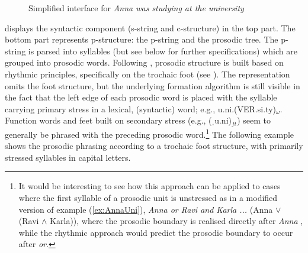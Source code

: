 \documentclass[output=paper,hidelinks]{langscibook}
\begin{document}
\begin{figure}
\caption{Simplified interface for {\em Anna was studying at the university} \citep[][408, showing only c-structure terminal nodes]{DLM:LFG}}%
\label{fig:simple}

\end{figure}

 displays the syntactic component (s-string and c-structure) in the top part. The bottom part represents p-structure: the p-string and the prosodic tree. The p-string is parsed into syllables (but see below for further specifications) which are grouped into prosodic words. Following \citet{LahiriPlank2010}, prosodic structure is built based on rhythmic principles, specifically on the trochaic foot (see ). The representation omits the foot structure, but the 
underlying formation algorithm is still visible in the fact that the left edge of each prosodic word is placed with the syllable carrying primary stress in a lexical, (syntactic) word; e.g., u.ni.(VER.si.ty)$_{\omega}$. Function words and feet built on secondary stress (e.g., (ˌu.ni)$_{ft}$) seem to generally be phrased with the preceding prosodic word.\footnote{It would be interesting to see how this approach can be applied to cases where the first syllable of a prosodic unit is unstressed as in a modified version of example (\ref{ex:AnnaUni}), {\em Anna or Ravi and Karla  ...} (Anna $\vee$ (Ravi $\wedge$ Karla)), where the prosodic boundary is realised directly after {\em Anna} \citep{Wagner2010}, while the rhythmic approach would predict the prosodic boundary to occur after {\em or}.} The following example shows the prosodic phrasing according to a trochaic foot structure, with primarily stressed syllables in capital letters.
\end{document}
